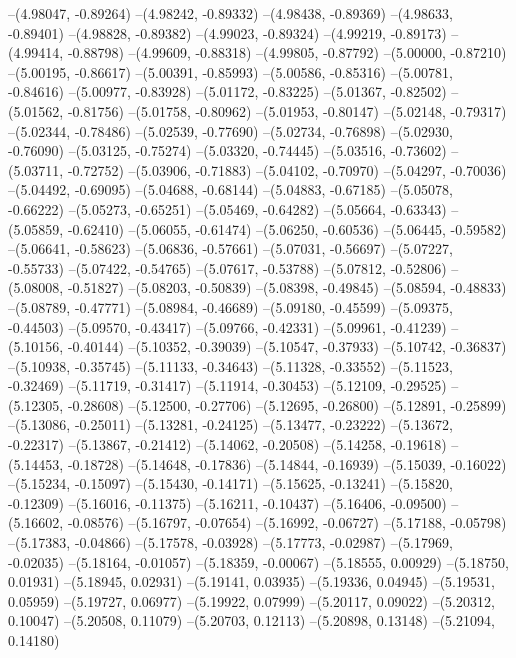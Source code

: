 --(4.98047, -0.89264)
--(4.98242, -0.89332)
--(4.98438, -0.89369)
--(4.98633, -0.89401)
--(4.98828, -0.89382)
--(4.99023, -0.89324)
--(4.99219, -0.89173)
--(4.99414, -0.88798)
--(4.99609, -0.88318)
--(4.99805, -0.87792)
--(5.00000, -0.87210)
--(5.00195, -0.86617)
--(5.00391, -0.85993)
--(5.00586, -0.85316)
--(5.00781, -0.84616)
--(5.00977, -0.83928)
--(5.01172, -0.83225)
--(5.01367, -0.82502)
--(5.01562, -0.81756)
--(5.01758, -0.80962)
--(5.01953, -0.80147)
--(5.02148, -0.79317)
--(5.02344, -0.78486)
--(5.02539, -0.77690)
--(5.02734, -0.76898)
--(5.02930, -0.76090)
--(5.03125, -0.75274)
--(5.03320, -0.74445)
--(5.03516, -0.73602)
--(5.03711, -0.72752)
--(5.03906, -0.71883)
--(5.04102, -0.70970)
--(5.04297, -0.70036)
--(5.04492, -0.69095)
--(5.04688, -0.68144)
--(5.04883, -0.67185)
--(5.05078, -0.66222)
--(5.05273, -0.65251)
--(5.05469, -0.64282)
--(5.05664, -0.63343)
--(5.05859, -0.62410)
--(5.06055, -0.61474)
--(5.06250, -0.60536)
--(5.06445, -0.59582)
--(5.06641, -0.58623)
--(5.06836, -0.57661)
--(5.07031, -0.56697)
--(5.07227, -0.55733)
--(5.07422, -0.54765)
--(5.07617, -0.53788)
--(5.07812, -0.52806)
--(5.08008, -0.51827)
--(5.08203, -0.50839)
--(5.08398, -0.49845)
--(5.08594, -0.48833)
--(5.08789, -0.47771)
--(5.08984, -0.46689)
--(5.09180, -0.45599)
--(5.09375, -0.44503)
--(5.09570, -0.43417)
--(5.09766, -0.42331)
--(5.09961, -0.41239)
--(5.10156, -0.40144)
--(5.10352, -0.39039)
--(5.10547, -0.37933)
--(5.10742, -0.36837)
--(5.10938, -0.35745)
--(5.11133, -0.34643)
--(5.11328, -0.33552)
--(5.11523, -0.32469)
--(5.11719, -0.31417)
--(5.11914, -0.30453)
--(5.12109, -0.29525)
--(5.12305, -0.28608)
--(5.12500, -0.27706)
--(5.12695, -0.26800)
--(5.12891, -0.25899)
--(5.13086, -0.25011)
--(5.13281, -0.24125)
--(5.13477, -0.23222)
--(5.13672, -0.22317)
--(5.13867, -0.21412)
--(5.14062, -0.20508)
--(5.14258, -0.19618)
--(5.14453, -0.18728)
--(5.14648, -0.17836)
--(5.14844, -0.16939)
--(5.15039, -0.16022)
--(5.15234, -0.15097)
--(5.15430, -0.14171)
--(5.15625, -0.13241)
--(5.15820, -0.12309)
--(5.16016, -0.11375)
--(5.16211, -0.10437)
--(5.16406, -0.09500)
--(5.16602, -0.08576)
--(5.16797, -0.07654)
--(5.16992, -0.06727)
--(5.17188, -0.05798)
--(5.17383, -0.04866)
--(5.17578, -0.03928)
--(5.17773, -0.02987)
--(5.17969, -0.02035)
--(5.18164, -0.01057)
--(5.18359, -0.00067)
--(5.18555, 0.00929)
--(5.18750, 0.01931)
--(5.18945, 0.02931)
--(5.19141, 0.03935)
--(5.19336, 0.04945)
--(5.19531, 0.05959)
--(5.19727, 0.06977)
--(5.19922, 0.07999)
--(5.20117, 0.09022)
--(5.20312, 0.10047)
--(5.20508, 0.11079)
--(5.20703, 0.12113)
--(5.20898, 0.13148)
--(5.21094, 0.14180)
